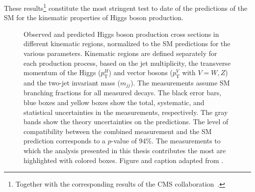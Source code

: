 These results\footnote{Together with the corresponding results of the CMS collaboration~\cite{CMSNaturePaper}.} constitute the most stringent test to date of the predictions of the SM for the kinematic properties of Higgs boson production.

\begin{figure}
    \caption[Observed and predicted Higgs boson production cross sections in different kinematic regions.]{
      Observed and predicted Higgs boson production cross sections in different
    kinematic regions, normalized to the SM predictions for the various parameters. 
    Kinematic regions are defined separately for each production process, based on the jet multiplicity, the transverse momentum of the Higgs ($p_{\textrm{T}}^H$) and vector bosons ($p_{\textrm{T}}^V$ with $V = W, Z$) and the two-jet invariant mass ($m_{jj}$).
    The measurements assume SM branching fractions for all measured decays. The black error bars, blue boxes and yellow boxes show the total, systematic, and statistical uncertainties in the measurements, respectively. The gray bands show the theory uncertainties on the predictions. The level of compatibility between the combined measurement and the SM prediction corresponds to a $p$-value of 94\%. 
    The measurements to which the \HWW analysis presented in this thesis contributes the most are highlighted with colored boxes. 
    Figure and caption adapted from .
    }
    \label{fig:stxs-stage12}
  \end{figure}

\FloatBarrier

